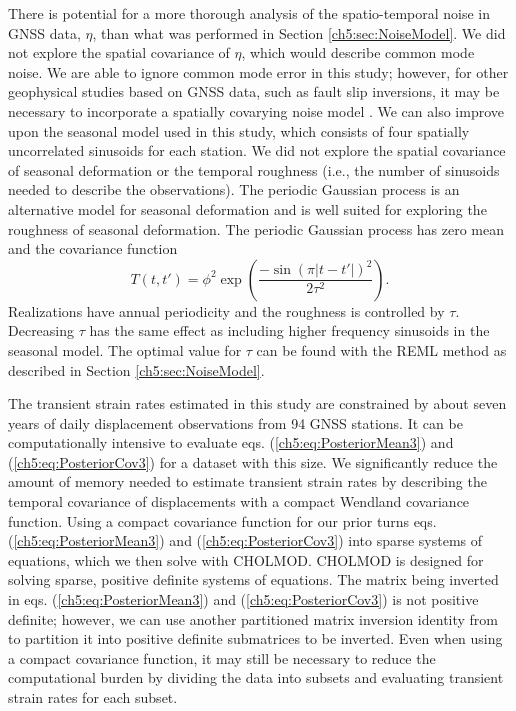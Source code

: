 There is potential for a more thorough analysis of the spatio-temporal
noise in GNSS data, $\eta$, than what was performed in Section
\ref{ch5:sec:NoiseModel}. We did not explore the spatial covariance of
$\eta$, which would describe common mode noise. We are able to ignore
common mode error in this study; however, for other geophysical
studies based on GNSS data, such as fault slip inversions, it may be
necessary to incorporate a spatially covarying noise model
\citep[e.g.,][]{Miyazaki2003}. We can also improve upon the seasonal
model used in this study, which consists of four spatially
uncorrelated sinusoids for each station. We did not explore the
spatial covariance of seasonal deformation or the temporal roughness
(i.e., the number of sinusoids needed to describe the observations).
The periodic Gaussian process \citep{Mackay1998} is an alternative
model for seasonal deformation and is well suited for exploring the
roughness of seasonal deformation.  The periodic Gaussian process has
zero mean and the covariance function
\begin{equation}\label{ch5:eq:Periodic}
T(t,t') = \phi^2 \exp\left(\frac{-\sin(\pi|t - t'|)^2}{2\tau^2}\right).
\end{equation}
Realizations have annual periodicity and the roughness is controlled
by $\tau$. Decreasing $\tau$ has the same effect as including higher
frequency sinusoids in the seasonal model. The optimal value for
$\tau$ can be found with the REML method as described in Section
\ref{ch5:sec:NoiseModel}.

The transient strain rates estimated in this study are constrained by
about seven years of daily displacement observations from 94 GNSS
stations. It can be computationally intensive to evaluate eqs.
(\ref{ch5:eq:PosteriorMean3}) and (\ref{ch5:eq:PosteriorCov3}) for a
dataset with this size. We significantly reduce the amount of memory
needed to estimate transient strain rates by describing the temporal
covariance of displacements with a compact Wendland covariance
function. Using a compact covariance function for our prior turns eqs.
(\ref{ch5:eq:PosteriorMean3}) and (\ref{ch5:eq:PosteriorCov3}) into
sparse systems of equations, which we then solve with CHOLMOD. CHOLMOD
is designed for solving sparse, positive definite systems of
equations. The matrix being inverted in eqs.
(\ref{ch5:eq:PosteriorMean3}) and (\ref{ch5:eq:PosteriorCov3}) is not
positive definite; however, we can use another partitioned matrix
inversion identity from \citet{Press2007} to partition it into
positive definite submatrices to be inverted. Even when using a
compact covariance function, it may still be necessary to reduce the
computational burden by dividing the data into subsets and evaluating
transient strain rates for each subset.

